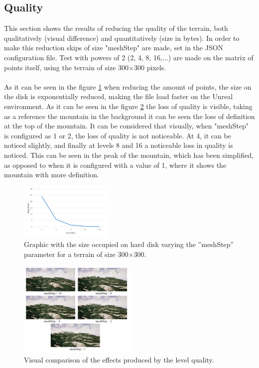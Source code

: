\documentclass[10pt,a4paper,twocolumn,twoside]{article}
\begin{document}
\subsection{Quality}
\label{qualitat}
This section shows the results of reducing the quality of the terrain, both qualitatively (visual difference) and quantitatively (size in bytes). In order to make this reduction skips of size "meshStep" are made, set in the JSON configuration file. Test with powers of 2 (2, 4, 8, 16,...) are made on the matrix of points itself, using the terrain of size 300$\times$300 pixels.
\\
\\
As it can be seen in the figure \ref{fig-qualitatmegas} when reducing the amount of points, the size on the disk is exponentially reduced, making the file load faster on the Unreal environment. As it can be seen in the figure \ref{fig-qualityvisual}  the loss of quality is visible, taking as a reference the mountain in the background it can be seen the loss of definition at the top of the mountain. It can be considered that visually, when "meshStep" is configured as 1 or 2, the loss of quality is not noticeable. At 4, it can be noticed slightly, and finally at levels 8 and 16 a noticeable loss in quality is noticed. This can be seen in the peak of the mountain, which has been simplified, as opposed to when it is configured with a value of 1, where it shows the mountain with more definition.

\begin{figure}[!h]
\centering
  	\includegraphics[width=0.4\textwidth]{qualitatmegas}
	\caption{Graphic with the size occupied on hard disk varying the ''meshStep'' parameter for a terrain of size 300$\times$300.}
	\label{fig-qualitatmegas}
\end{figure}

\begin{figure}[!h]
\centering
  	\includegraphics[width=0.5\textwidth]{quality/quality}
	\caption{Visual comparison of the effects produced by the level quality.}
	\label{fig-qualityvisual}
\end{figure}
\end{document}
